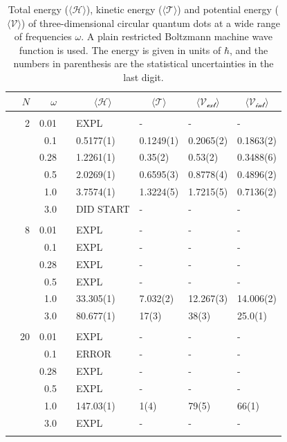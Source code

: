 \begin{table}
	\caption{Total energy ($\langle \mathcal{H}\rangle$), kinetic energy ($\langle\mathcal{T}\rangle$) and potential energy ($\langle \mathcal{V}\rangle$) of three-dimensional circular quantum dots at a wide range of frequencies $\omega$. A plain restricted Boltzmann machine wave function is used. The energy is given in units of $\hbar$, and the numbers in parenthesis are the statistical uncertainties in the last digit.}
	\label{tab:splitfrequencyQDRBM3D}
	\begin{tabularx}{\textwidth}{R{1.5cm}rrcR{2.3cm}R{2.3cm}R{2.3cm}R{2.3cm}} \hline\hline
		& & $\omega$ &&  &  &  &  \\ \hline \\
		&2 & 0.01 && EXPL & - & - & - \\
		&& 0.1 && 0.5177(1) & 0.1249(1) & 0.2065(2) & 0.1863(2) \\
		&& 0.28 && 1.2261(1) & 0.35(2) & 0.53(2) & 0.3488(6) \\
		&& 0.5 && 2.0269(1) & 0.6595(3) & 0.8778(4) & 0.4896(2) \\
		&& 1.0 && 3.7574(1) & 1.3224(5) & 1.7215(5) & 0.7136(2) \\
		&& 3.0 && DID START & - & - & - \\ \hdashline \\
		
		&8 & 0.01 && EXPL & - & - & - \\
		&& 0.1 && EXPL & - & - & - \\
		&& 0.28 && EXPL & - & - & - \\
		&& 0.5 && EXPL & - & - & - \\
		&& 1.0 && 33.305(1) & 7.032(2) & 12.267(3) & 14.006(2) \\
		&& 3.0 && 80.677(1) & 17(3) & 38(3) & 25.0(1) \\ \hdashline \\
		
		&20 & 0.01 && EXPL & - & - & - \\
		&& 0.1 && ERROR & - & - & - \\
		&& 0.28 && EXPL & - & - & - \\
		&& 0.5 && EXPL & - & - & - \\
		&& 1.0 && 147.03(1) & 1(4) & 79(5) & 66(1) \\
		&& 3.0 && EXPL & - & - & - \\ \hdashline \\
		

\end{tabularx}
\end{table}
